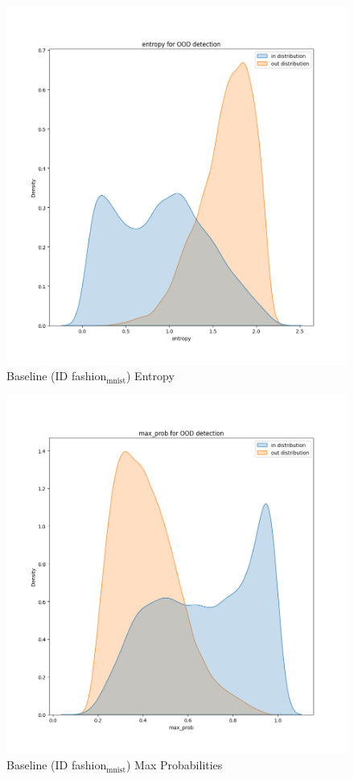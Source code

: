 \documentclass[11pt]{article}
\begin{document}
\begin{figure}[htbp]
\centering
\includegraphics[width=.9\linewidth]{./base_fash_entropy.png}
\caption{\label{fig:org48f3c2d}
Baseline (ID fashion\(_{\text{mnist}}\)) Entropy}
\end{figure}

\begin{figure}[htbp]
\centering
\includegraphics[width=.9\linewidth]{./base_fash_max_prob.png}
\caption{\label{fig:org90b94ba}
Baseline (ID fashion\(_{\text{mnist}}\)) Max Probabilities}
\end{figure}
\end{document}
